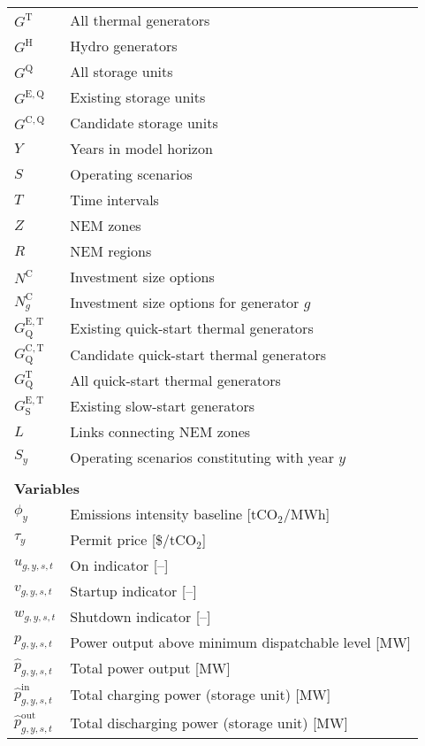 \documentclass{article}
\newcommand{\sGeneratorsThermal}{G^{\mathrm{T}}}
\newcommand{\sGeneratorsHydro}{G^{\mathrm{H}}}
\newcommand{\sStorage}{G^{\mathrm{Q}}}
\newcommand{\sStorageExisting}{G^{\mathrm{E,Q}}}
\newcommand{\sStorageCandidate}{G^{\mathrm{C,Q}}}
\newcommand{\sYears}{Y}
\newcommand{\sScenarios}{S}
\newcommand{\sIntervals}{T}
\newcommand{\sZones}{Z}
\newcommand{\sRegions}{R}
\newcommand{\sInvestmentSizeOptions}{N^{\mathrm{C}}}
\newcommand{\sInvestmentSizeOptionsGenerator}[1][\iGenerator]{\sInvestmentSizeOptions_{#1}}
\newcommand{\sGeneratorsExistingThermalQuickStart}{G^{\mathrm{E,T}}_\mathrm{Q}}
\newcommand{\sGeneratorsCandidateThermalQuickStart}{G^{\mathrm{C,T}}_\mathrm{Q}}
\newcommand{\sGeneratorsThermalQuickStart}{G^{\mathrm{T}}_\mathrm{Q}}
\newcommand{\sGeneratorsExistingThermalSlowStart}{G^{\mathrm{E,T}}_\mathrm{S}}
\newcommand{\sLinks}{L}
\newcommand{\sScenariosYear}{\sScenarios_{\iYear}}
\newcommand{\iGenerator}{g}
\newcommand{\iYear}{y}
\newcommand{\iScenario}{s}
\newcommand{\iInterval}{t}
\newcommand{\vBaseline}[1][\iYear]{\phi_{#1}}
\newcommand{\vPermitPrice}[1][\iYear]{\tau_{#1}}
\newcommand{\vStartupIndicator}[1][\iGenerator,\iYear,\iScenario,\iInterval]{v_{#1}}
\newcommand{\vShutdownIndicator}[1][\iGenerator,\iYear,\iScenario,\iInterval]{w_{#1}}
\newcommand{\vOnIndicator}[1][\iGenerator,\iYear,\iScenario,\iInterval]{u_{#1}}
\newcommand{\vPower}[1][\iGenerator,\iYear,\iScenario,\iInterval]{p_{#1}}
\newcommand{\vPowerTotal}[1][\iGenerator,\iYear,\iScenario,\iInterval]{\hat{p}_{#1}}
\newcommand{\vPowerTotalIn}[1][\iGenerator,\iYear,\iScenario,\iInterval]{\hat{p}^{\mathrm{in}}_{#1}}
\newcommand{\vPowerTotalOut}[1][\iGenerator,\iYear,\iScenario,\iInterval]{\hat{p}^{\mathrm{out}}_{#1}}
\begin{document}
\begin{longtable}{ p{}  p{}}
	$\sGeneratorsThermal$ & All thermal generators\\
	$\sGeneratorsHydro$ & Hydro generators\\
	$\sStorage$ & All storage units\\
	$\sStorageExisting$ & Existing storage units\\
	$\sStorageCandidate$ & Candidate storage units\\
	$\sYears$ & Years in model horizon\\
	$\sScenarios$ & Operating scenarios\\
	$\sIntervals$ & Time intervals\\
	$\sZones$ & NEM zones\\
	$\sRegions$ & NEM regions\\
	$\sInvestmentSizeOptions$ & Investment size options\\
	$\sInvestmentSizeOptionsGenerator$ & Investment size options for generator $\iGenerator$\\
	$\sGeneratorsExistingThermalQuickStart$ & Existing quick-start thermal generators\\
	$\sGeneratorsCandidateThermalQuickStart$ & Candidate quick-start thermal generators\\
	$\sGeneratorsThermalQuickStart$ & All quick-start thermal generators\\
	$\sGeneratorsExistingThermalSlowStart$ & Existing slow-start generators\\
	$\sLinks$ & Links connecting NEM zones\\
	$\sScenariosYear$ & Operating scenarios constituting with year $\iYear$\\
	& \\
	\multicolumn{2}{l}{\textbf{Variables}}\\
	$\vBaseline$ & Emissions intensity baseline [tCO$_{2}$/MWh]\\
	$\vPermitPrice$ & Permit price [\$/tCO$_{2}$]\\

	$\vOnIndicator$ & On indicator [--]\\
	$\vStartupIndicator$ & Startup indicator [--]\\
	$\vShutdownIndicator$ & Shutdown indicator [--]\\

	$\vPower$ & Power output above minimum dispatchable level [MW]\\
	$\vPowerTotal$ & Total power output [MW]\\
	$\vPowerTotalIn$ & Total charging power (storage unit) [MW]\\
	$\vPowerTotalOut$ & Total discharging power (storage unit) [MW]\\


\end{longtable}
\end{document}
